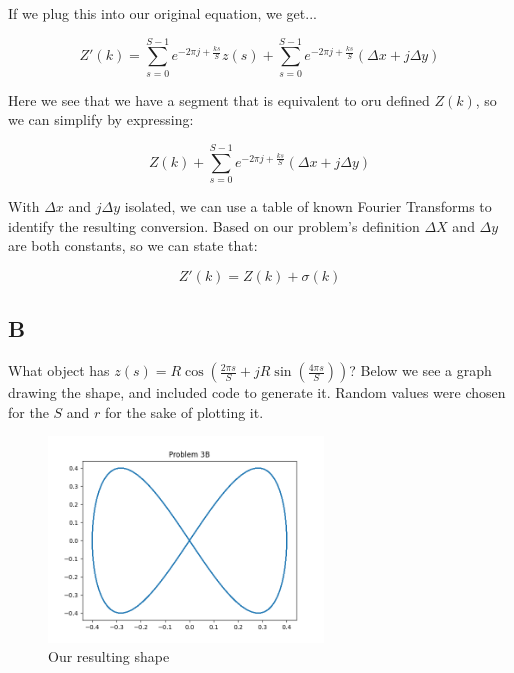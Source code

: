\documentclass{article}
\begin{document}
\noindent If we plug this into our original equation, we get...

\begin{equation}
    Z'(k) = \sum_{s=0}^{S-1} e^{-2\pi j + \frac{ks}{S}}z(s) + \sum_{s=0}^{S-1} e^{-2\pi j + \frac{ks}{S}} (\Delta x + j \Delta y)
\end{equation}

\noindent Here we see that we have a segment that is equivalent to oru defined $Z(k)$, so we can simplify by expressing:

\begin{equation}
    Z(k) + \sum_{s=0}^{S-1} e^{-2\pi j + \frac{ks}{S}} (\Delta x + j \Delta y)
\end{equation}

\noindent With $\Delta x$ and $j \Delta y$ isolated, we can use a table of known Fourier Transforms to identify the resulting conversion. Based on our problem's definition $\Delta X$ and $\Delta y$ are both constants, so we can state that:

\begin{equation}
    Z'(k) = Z(k) + \sigma(k)
\end{equation}

\subsection*{B}

What object has $z(s) = R \cos(\frac{2\pi s}{S} + jR \sin(\frac{4\pi s}{S}))$? Below we see a graph drawing the shape, and included code to generate it. Random values were chosen for the $S$ and $r$ for the sake of plotting it.

\begin{figure}[H]
    \centering
    \includegraphics[width = 0.65\textwidth]{imgs/prob3_b.png}
    \caption{Our resulting shape}
    \label{fig:prob3-b}
\end{figure}
\end{document}
